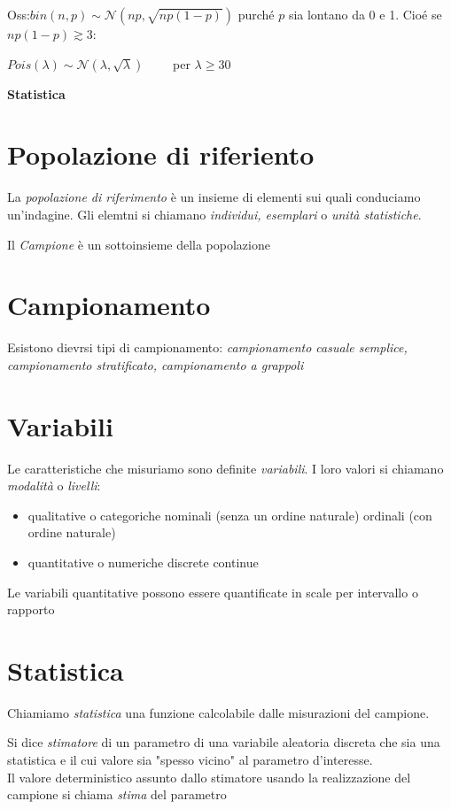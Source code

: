 \documentclass[12pt, a4paper]{article}
\begin{document}
Oss:$bin(n,p)\sim\mathcal{N}(np,\sqrt{np(1-p)})$ purché $p$ sia lontano da 0 e 1. Cioé se $np(1-p)\gtrsim 3$:
\begin{center}
    $Pois(\lambda)\sim\mathcal{N}(\lambda,\sqrt\lambda)\qquad$ per $\lambda\geq 30$
\end{center}

\newpage

\begin{center}
    \textbf{Statistica}
\end{center}

\section{Popolazione di riferiento}
La \textit{popolazione di riferimento} è un insieme di elementi sui quali conduciamo un'indagine. Gli elemtni si
chiamano \textit{individui, esemplari} o \textit{unità statistiche}.

Il \textit{Campione} è un sottoinsieme della popolazione

\section{Campionamento}
Esistono dievrsi tipi di campionamento: \textit{campionamento casuale semplice, campionamento stratificato, 
campionamento a grappoli}

\section{Variabili}
Le caratteristiche che misuriamo sono definite \textit{variabili}. I loro valori si chiamano \textit{modalità} o
\textit{livelli}:
\begin{itemize}
    \item qualitative o categoriche
    \subitem nominali (senza un ordine naturale)
    \subitem ordinali (con ordine naturale)
    \item quantitative o numeriche
    \subitem discrete
    \subitem continue
\end{itemize}
Le variabili quantitative possono essere quantificate in scale per intervallo o rapporto

\section{Statistica}
Chiamiamo \textit{statistica} una funzione calcolabile dalle misurazioni del campione.

Si dice \textit{stimatore} di un parametro di una variabile aleatoria discreta che sia una statistica e il cui
valore sia "spesso vicino" al parametro d'interesse.\\ Il valore deterministico assunto dallo stimatore usando la
realizzazione del campione si chiama \textit{stima} del parametro
\end{document}
